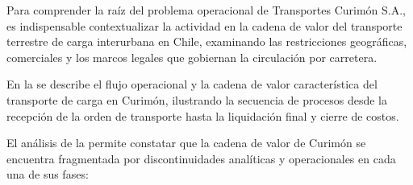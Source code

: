 Para comprender la raíz del problema operacional de Transportes Curimón S.A., es indispensable contextualizar la actividad en la cadena de valor del transporte terrestre de carga interurbana en Chile, examinando las restricciones geográficas, comerciales y los marcos legales que gobiernan la circulación por carretera.

En la  se describe el flujo operacional y la cadena de valor característica del transporte de carga en Curimón, ilustrando la secuencia de procesos desde la recepción de la orden de transporte hasta la liquidación final y cierre de costos.


El análisis de la  permite constatar que la cadena de valor de Curimón se encuentra fragmentada por discontinuidades analíticas y operacionales en cada una de sus fases:

